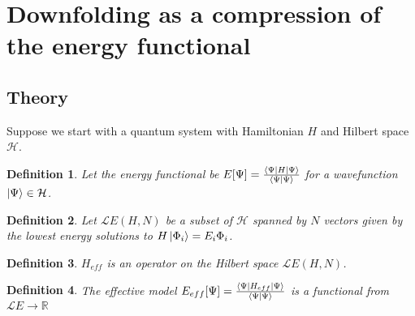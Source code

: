 \newtheorem{theorem}{Theorem}
\newtheorem{definition}{Definition}


\section{Downfolding as a compression of the energy functional}

\subsection{Theory} 

Suppose we start with a quantum system with Hamiltonian $H$ and Hilbert space ${\mathcal H}$.

\begin{definition}
Let the energy functional be $E[\Psi] = \frac{\bra{\Psi}H\ket{\Psi}}{\braket{\Psi|\Psi}}$ for a wavefunction $\ket{\Psi} \in {\mathcal H}$.
\end{definition}


\begin{definition}
Let ${\mathcal LE}(H,N)$ be a subset of ${\mathcal H}$ spanned by $N$ vectors given by the lowest energy solutions to $H\ket{\Phi_i}=E_i{\Phi_i}$. 
\end{definition}

\begin{definition}
$H_{eff}$ is an operator on the Hilbert space ${\mathcal LE(H,N)}$.	 
\end{definition}


\begin{definition}
The effective model $E_{eff}[\Psi]=\frac{\bra{\Psi}H_{eff}\ket{\Psi}}{\braket{\Psi|\Psi}}$ is a functional from ${\mathcal LE} \rightarrow \mathbb{R}$
\end{definition}



